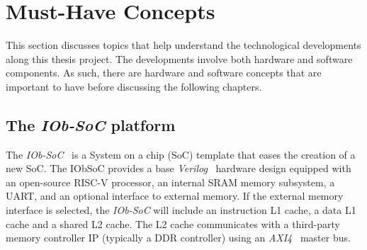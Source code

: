 
\section{Must-Have Concepts}
\label{sec:must_have_concepts}

This section discusses topics that help understand the technological developments along this thesis project. The developments involve both hardware and software components. As such, there are hardware and software concepts that are important to have before discussing the following chapters.
%


\subsection{The \textit{IOb-SoC} platform}

The \textit{IOb-SoC}~\cite{iob_soc} is a System on a chip (SoC) template that eases the creation of a new SoC. The IObSoC provides a base \textit{Verilog}~\cite{thomas2008verilog} hardware design equipped with an open-source RISC-V processor, an internal SRAM memory subsystem, a UART, and an optional interface to external memory. If the external memory interface is selected, the \textit{IOb-SoC} will include an instruction L1 cache, a data L1 cache and a shared L2 cache. The L2 cache communicates with a third-party memory controller IP (typically a DDR controller) using an \textit{AXI4}~\cite{tidala2018high} master bus.

